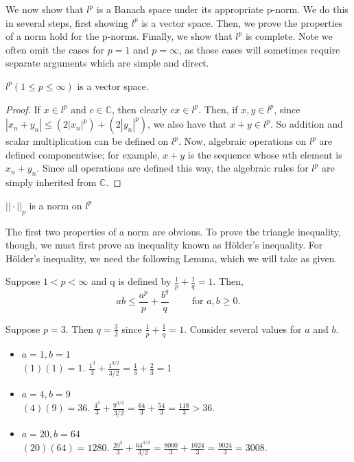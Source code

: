 We now show that $l^p$ is a Banach space under its appropriate p-norm.  We do this in several steps, first showing $l^p$ is a vector space.  Then, we prove the properties of a norm hold for the p-norms.  Finally, we show that $l^p$ is complete.  Note we often omit the cases for $p=1$ and $p=\infty$, as those cases will sometimes require separate arguments which are simple and direct.

\begin{prop}
$l^p (1 \leq p \leq \infty)$ is a vector space.
\end{prop}

\begin{proof}
If $x \in l^p$ and $c \in \mathbb{C}$, then clearly $cx \in l^p$.  Then, if $x,y \in l^p$, since $|x_n + y_n| \leq (2|x_n|^p) + (2|y_n|^p)$, we also have that $x+y \in l^p$.  So addition and scalar multiplication can be defined on $l^p$.  Now, algebraic operations on $l^p$ are defined componentwise; for example, $x+y$ is the sequence whose $n$th element is $x_n + y_n$.  Since all operations are defined this way, the algebraic rules for $l^p$ are simply inherited from $\mathbb{C}$.
\end{proof}

\begin{prop}
$||\cdot||_p$ is a norm on $l^p$
\end{prop}

The first two properties of a norm are obvious.  To prove the triangle inequality, though, we must first prove an inequality known as H{\"o}lder's inequality.  For H{\"o}lder's inequality, we need the following Lemma, which we will take as given.

\begin{lemma}
Suppose $1 < p < \infty$ and q is defined by $\frac{1}{p} + \frac{1}{q} = 1$.  Then,
\[ab \leq \frac{a^p}{p} + \frac{b^q}{q} \qquad \textrm{ for } a,b \geq 0.\]
\end{lemma}

\begin{example}
Suppose $p = 3$.  Then $q = \frac{3}{2}$ since $\frac{1}{p} + \frac{1}{q} = 1$.  Consider several values for $a$ and $b$.
\begin{itemize}
\item $a = 1, b=1$\\
$(1)(1) = 1.$  $\frac{1^3}{3} + \frac{1^{3/2}}{3/2} = \frac{1}{3} + \frac{2}{3} = 1$ 
\item $a = 4, b=9$\\
$(4)(9) = 36$.  $\frac{4^3}{3} + \frac{9^{3/2}}{3/2} = \frac{64}{3} + \frac{54}{3} = \frac{118}{3} > 36$.
\item $a = 20, b=64$\\
$(20)(64) = 1280$.  $\frac{20^3}{3} + \frac{64^{3/2}}{3/2} = \frac{8000}{3} + \frac{1024}{3} = \frac{9024}{3} = 3008$.
\end{itemize}
\end{example}

